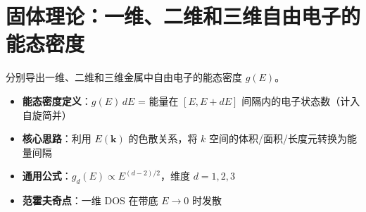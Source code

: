 \section{固体理论：一维、二维和三维自由电子的能态密度}
\label{sec:free-electron-dos}

\begin{modelbox}[题目：各维度自由电子能态密度的推导]
分别导出一维、二维和三维金属中自由电子的能态密度 $g(E)$。
\end{modelbox}

\begin{tipbox}[考点快速分析]
\begin{itemize}
    \item \textbf{能态密度定义}：$g(E)\,dE$ = 能量在 $[E,E+dE]$ 间隔内的电子状态数（计入自旋简并）
    \item \textbf{核心思路}：利用 $E(\bm{k})$ 的色散关系，将 $k$ 空间的体积/面积/长度元转换为能量间隔
    \item \textbf{通用公式}：$g_d(E)\propto E^{(d-2)/2}$，维度 $d=1,2,3$
    \item \textbf{范霍夫奇点}：一维 DOS 在带底 $E\to0$ 时发散
\end{itemize}
\end{tipbox}

